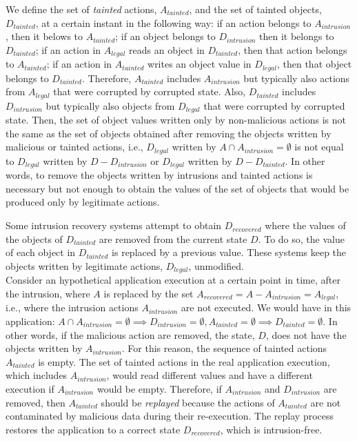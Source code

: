 We define the set of \textit{tainted} actions, $A_{tainted}$, and the set of tainted objects, $D_{tainted}$, at a certain instant in the following way: if an action belongs to $A_{intrusion}$, then it belows to $A_{tainted}$; if an object belongs to $D_{intrusion}$ then it belongs to $D_{tainted}$; if an action in $A_{legal}$ reads an object in $D_{tainted}$, then that action belongs to $A_{tainted}$; if an action in $A_{tainted}$ writes an object value in $D_{legal}$, then that object belongs to $D_{tainted}$. Therefore, $A_{tainted}$ includes $A_{intrusion}$ but typically also actions from $A_{legal}$ that were corrupted by corrupted state. Also, $D_{tainted}$ includes $D_{intrusion}$ but typically also objects from $D_{legal}$ that were corrupted by corrupted state. Then, the set of object values written only by non-malicious actions is not the same as the set of objects obtained after removing the objects written by malicious or tainted actions, i.e., $D_{legal}$ written by $A \cap A_{intrusion} = \emptyset$ is not equal to $D_{legal}$ written by $D-D_{intrusion}$ or $D_{legal}$ written by $D-D_{tainted}$. In other words, to remove the objects written by intrusions and tainted actions is necessary but not enough to obtain the values of the set of objects that would be produced only by legitimate actions.

Some intrusion recovery systems \cite{taser,itdb,phoenix} attempt to obtain $D_{recovered}$ where the values of the objects of $D_{tainted}$ are removed from the current state $D$. To do so, the value of each object in $D_{tainted}$ is replaced by a previous value. These systems keep the objects written by legitimate actions, $D_{legal}$, unmodified. \\


Consider an hypothetical application execution at a certain point in time, after the intrusion, where $A$ is replaced by the set $A_{recovered} = A - A_{intrusion} = A_{legal}$, i.e., where the intrusion actions $A_{intrusion}$ are not executed. We would have in this application: $A \cap A_{intrusion} = \emptyset \implies D_{intrusion} = \emptyset, A_{tainted} = \emptyset \implies D_{tainted} = \emptyset$. In other words, if the malicious action are removed, the state, $D$, does not have the objects written by $A_{intrusion}$. For this reason, the sequence of tainted actions $A_{tainted}$ is empty. The set of tainted actions in the real application execution, which includes $A_{intrusion}$, would read different values and have a different execution if $A_{intrusion}$ would be empty. Therefore, if $A_{intrusion}$ and $D_{intrusion}$ are removed, then $A_{tainted}$ should be \emph{replayed} because the actions of $A_{tainted}$ are not contaminated by malicious data during their re-execution. The replay process restores the application to a correct state $D_{recovered}$, which is intrusion-free.\\

